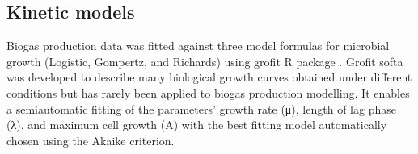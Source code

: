 \subsection{Kinetic models}
Biogas production data was fitted against three model formulas for microbial growth (Logistic, Gompertz, and Richards) using grofit R package \cite{Kahm_2010}. Grofit softa was developed to describe many biological growth curves obtained under different conditions but has rarely been applied to biogas production modelling. It enables a semiautomatic fitting of the parameters’ growth rate (μ), length of lag phase (λ), and maximum cell growth (A) with the best fitting model automatically chosen using the Akaike criterion.